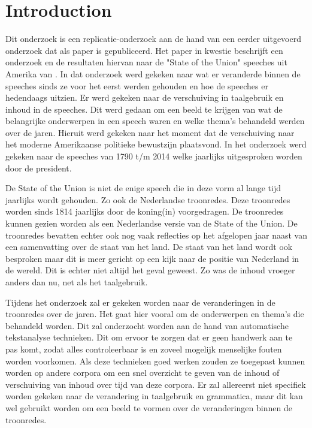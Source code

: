 \section{Introduction}
\label{sec:intro}

Dit onderzoek is een replicatie-onderzoek aan de hand van een eerder uitgevoerd onderzoek dat als paper is gepubliceerd. Het paper in kwestie beschrijft een onderzoek en de resultaten hiervan naar de "State of the Union" speeches uit Amerika van \cite{state}. In dat onderzoek werd gekeken naar wat er veranderde binnen de speeches sinds ze voor het eerst werden gehouden en hoe de speeches er hedendaags uitzien. Er werd gekeken naar de verschuiving in taalgebruik en inhoud in de speeches. Dit werd gedaan om een beeld te krijgen van wat de belangrijke onderwerpen in een speech waren en welke thema's behandeld werden over de jaren. Hieruit werd gekeken naar het moment dat de verschuiving naar het moderne Amerikaanse politieke bewustzijn plaatsvond. In het onderzoek werd gekeken naar de speeches van 1790 t/m 2014 welke jaarlijks uitgesproken worden door de president.

De State of the Union is niet de enige speech die in deze vorm al lange tijd jaarlijks wordt gehouden. Zo ook de Nederlandse troonredes. Deze troonredes worden sinds 1814 jaarlijks door de koning(in) voorgedragen. De troonredes kunnen gezien worden als een Nederlandse versie van de State of the Union. De troonredes bevatten echter ook nog vaak reflecties op het afgelopen jaar naast van een samenvatting over de staat van het land. De staat van het land wordt ook besproken maar dit is meer gericht op een kijk naar de positie van Nederland in de wereld. Dit is echter niet altijd het geval geweest. Zo was de inhoud vroeger anders dan nu, net als het taalgebruik.

Tijdens het onderzoek zal er gekeken worden naar de veranderingen in de troonredes over de jaren. Het gaat hier vooral om de onderwerpen en thema's die behandeld worden. Dit zal onderzocht worden aan de hand van automatische tekstanalyse technieken. Dit om ervoor te zorgen dat er geen handwerk aan te pas komt, zodat alles controleerbaar is en zoveel mogelijk menselijke fouten worden voorkomen. Als deze technieken goed werken zouden ze toegepast kunnen worden op andere corpora om een snel overzicht te geven van de inhoud of verschuiving van inhoud over tijd van deze corpora. Er zal allereerst niet specifiek worden gekeken naar de verandering in taalgebruik en grammatica, maar dit kan wel gebruikt worden om een beeld te vormen over de veranderingen binnen de troonredes.

